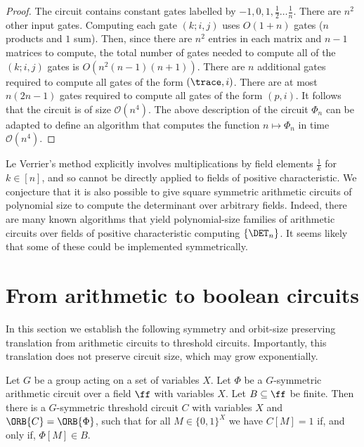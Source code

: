 \documentclass{toc}
\begin{document}
\begin{proof}
  The circuit contains constant gates labelled by $-1, 0, 1, \frac{1}{2} \ldots
  \frac{1}{n}$.  There are $n^2$ other input gates. Computing each gate $(k; i, j)$ uses $O(1+n)$ gates ($n$ products and $1$ sum). Then, since there are $n^2$ entries in each matrix and $n-1$ matrices to compute, the total number of gates needed to compute all of the $(k;i,j)$ gates is $O(n^2 (n-1) (n+1))$. There are $n$ additional gates required to compute all gates of the form $(\trace,
  i)$.  There are at most $n (2n -1)$  gates required to compute all
  gates of the form $(p, i)$. It follows that the circuit is of size
  $\mathcal{O}(n^4)$. The above description of the circuit $\Phi_n$ can be
  adapted to define an algorithm that computes the function $n \mapsto \Phi_n$
  in time $\mathcal{O}(n^4)$.
\end{proof}

Le Verrier's method explicitly involves multiplications by field elements
$\frac{1}{k}$ for $k \in [n]$, and so cannot be directly applied to fields of
positive characteristic. We conjecture that it is also possible to give square
symmetric arithmetic circuits of polynomial size to compute the determinant over
arbitrary fields. Indeed, there are many known algorithms that yield
polynomial-size families of arithmetic circuits over fields of positive
characteristic computing $\{\DET_n\}$. It seems likely that some of these could
be implemented symmetrically.



\section{From arithmetic to boolean circuits}\label{sec:formulas-to-circuits}

In this section we establish the following symmetry and orbit-size preserving translation from
arithmetic circuits to threshold circuits. Importantly, this translation does not preserve circuit size, which may grow exponentially.

\begin{theorem}
  Let $G$ be a group acting on a set of variables $X$. Let $\Phi$ be a
  $G$-symmetric arithmetic circuit over a field $\ff$ with variables $X$. Let $B
  \subseteq \ff$ be finite. Then there is a $G$-symmetric threshold circuit $C$
  with variables $X$ and $\ORB{C} = \ORB{\Phi}$, such that for all $M \in \{0, 1\}^X$ we have $C[M] = 1$
  if, and only if, $\Phi[M] \in B$.
  \label{thm:arithmetic-to-boolean}
\end{theorem}
\end{document}
